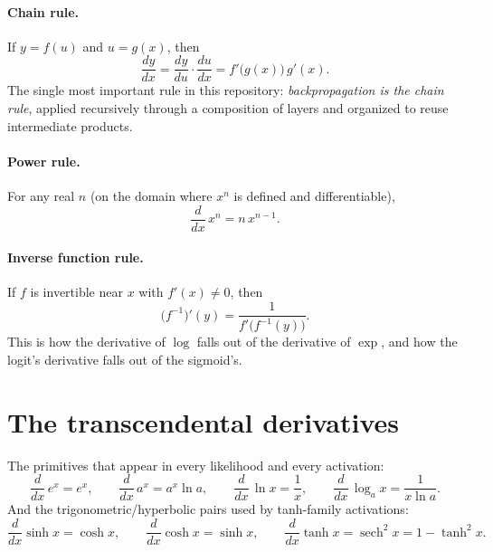 \documentclass[11pt]{article}
\begin{document}
\paragraph{Chain rule.} If $y = f(u)$ and $u = g(x)$, then
\begin{equation}
  \frac{dy}{dx} = \frac{dy}{du}\cdot\frac{du}{dx}
  = f'\bigl(g(x)\bigr)\,g'(x).
  \label{eq:chain}
\end{equation}
The single most important rule in this repository:
\emph{backpropagation is the chain rule}, applied recursively through a
composition of layers and organized to reuse intermediate products.

\paragraph{Power rule.} For any real $n$ (on the domain where $x^n$ is
defined and differentiable),
\begin{equation}
  \frac{d}{dx}\,x^n = n\,x^{n-1}.
  \label{eq:power}
\end{equation}

\paragraph{Inverse function rule.} If $f$ is invertible near $x$ with
$f'(x) \ne 0$, then
\begin{equation}
  \bigl(f^{-1}\bigr)'(y) = \frac{1}{f'\bigl(f^{-1}(y)\bigr)}.
  \label{eq:inverse}
\end{equation}
This is how the derivative of $\log$ falls out of the derivative of
$\exp$, and how the logit's derivative falls out of the sigmoid's.

\section{The transcendental derivatives}

The primitives that appear in every likelihood and every activation:
\begin{equation}
  \frac{d}{dx}\,e^{x} = e^{x},
  \qquad
  \frac{d}{dx}\,a^{x} = a^{x}\ln a,
  \qquad
  \frac{d}{dx}\,\ln x = \frac{1}{x},
  \qquad
  \frac{d}{dx}\,\log_a x = \frac{1}{x \ln a}.
  \label{eq:transcendental}
\end{equation}
And the trigonometric/hyperbolic pairs used by tanh-family activations:
\begin{equation}
  \frac{d}{dx}\sinh x = \cosh x,
  \qquad
  \frac{d}{dx}\cosh x = \sinh x,
  \qquad
  \frac{d}{dx}\tanh x = \operatorname{sech}^2 x = 1 - \tanh^2 x.
  \label{eq:hyperbolic}
\end{equation}
\end{document}

